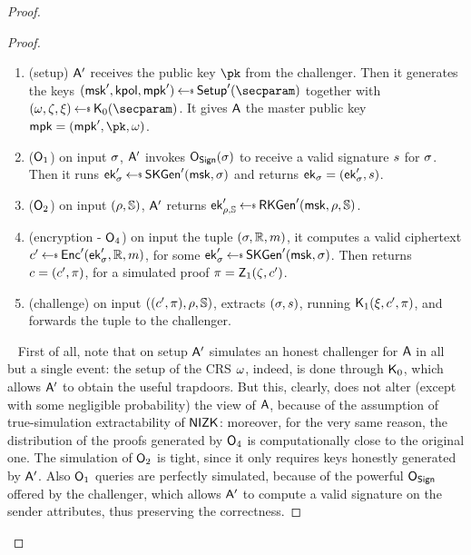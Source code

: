 \begin{theorem}
\begin{proof}
\begin{lemma}
\begin{proof}
                \begin{enumerate}
                    \item (setup) $\mathsf{A}'$ receives the public key $\pk$ from the challenger. Then it generates the keys $(\msk', \kpol, \mpk') \getsr \setup'(\secparam)$ together with $(\crs,\tpsim,\tpext)\getsr\nizkext_0(\secparam)$. It gives $\mathsf{A}$ the master public key $\mpk = (\mpk', \pk, \crs)$.
                    \item ($\mathsf{O}_1$) on input $\sigma$, $\mathsf{A}'$ invokes $\mathsf{O}_{\mathsf{Sign}}(\sigma)$ to receive a valid signature $s$ for $\sigma$. Then it runs $\ek'_\sattr \getsr \skgen'(\msk, \sattr)$ and returns $\mathsf{ek}_\sigma = (\mathsf{ek}_\sigma', s)$.
                    \item ($\mathsf{O}_2$) on input $(\rho, \mathbb{S})$, $\mathsf{A}'$ returns $\ek'_{\rattr, \saccess} \getsr \rkgen'(\msk, \rattr, \saccess)$.
                    \item (encryption - $\mathsf{O}_4$) on input the tuple $(\sigma, \mathbb{R}, m)$, it computes a valid ciphertext $\cipher' \getsr \enc'(\ek'_\sattr, \raccess, \msg)$, for some $\ek'_\sattr \getsr \skgen'(\msk, \sattr)$. Then returns $c = (c', \pi)$, for a simulated proof $\pi = \mathsf{Z}_1(\zeta, c')$.
                    \item (challenge) on input $((c', \pi), \rho, \mathbb{S})$, extracts $(\sigma, s)$, running $\mathsf{K}_1(\xi, c', \pi)$, and forwards the tuple to the challenger.
                \end{enumerate}
                ~\newline
                First of all, note that on setup $\mathsf{A}'$ simulates an honest challenger for $\mathsf{A}$ in all but a single event: the setup of the CRS $\omega$, indeed, is done through $\mathsf{K}_0$, which allows $\mathsf{A}'$ to obtain the useful trapdoors. But this, clearly, does not alter (except with some negligible probability) the view of $\mathsf{A}$, because of the assumption of true-simulation extractability of $\mathsf{NIZK}$: moreover, for the very same reason, the distribution of the proofs generated by $\mathsf{O}_4$ is computationally close to the original one.
                The simulation of $\mathsf{O}_2$ is tight, since it only requires keys honestly generated by $\mathsf{A}'$.
                Also $\mathsf{O}_1$ queries are perfectly simulated, because of the powerful $\mathsf{O}_{\mathsf{Sign}}$ offered by the challenger, which allows $\mathsf{A}'$ to compute a valid signature on the sender attributes, thus preserving the correctness.

\end{proof}
\end{lemma}
\end{proof}
\end{theorem}
